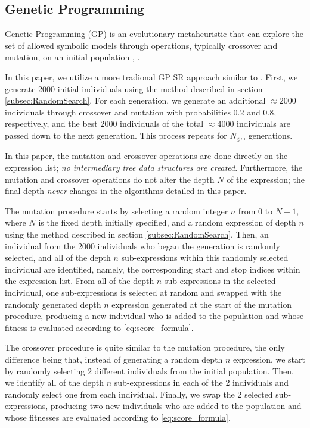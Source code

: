 \documentclass[12pt]{iopart}
\begin{document}
\subsection{Genetic Programming} \label{subsec:GeneticProgramming}
Genetic Programming (GP) is an evolutionary metaheuristic that can explore the set of allowed symbolic models through operations, typically crossover and mutation, on an initial population \cite{manti2023discovering} \cite{PoliFieldGuideGP}, \cite{Koza1994}.
\par In this paper, we utilize a more tradional GP SR approach similar to \cite{manti2023discovering}. First, we generate 2000 initial individuals using the method described in section \ref{subsec:RandomSearch}. For each generation, we generate an additional $\approx 2000$ individuals through crossover and mutation with probabilities 0.2 and 0.8, respectively, and the best 2000 individuals of the total $\approx 4000$ individuals are passed down to the next generation. This process repeats for $N_{\mathrm{gen}}$ generations.
\par In this paper, the mutation and crossover operations are done directly on the expression list; \emph{no intermediary tree data structures are created}. Furthermore, the mutation and crossover operations do not alter the depth $N$ of the expression; the final depth \emph{never} changes in the algorithms detailed in this paper. 
\par The mutation procedure starts by selecting a random integer $n$ from $0$ to $N-1$, where $N$ is the fixed depth initially specified, and a random expression of depth $n$ using the method described in section \ref{subsec:RandomSearch}. Then, an individual from the 2000 individuals who began the generation is randomly selected, and all of the depth $n$ sub-expressions within this randomly selected individual are identified, namely, the corresponding start and stop indices within the expression list. From all of the depth $n$ sub-expressions in the selected individual, one sub-expressions is selected at random and swapped with the randomly generated depth $n$ expression generated at the start of the mutation procedure, producing a new individual who is added to the population and whose fitness is evaluated according to \ref{eq:score_formula}.
\par The crossover procedure is quite similar to the mutation procedure, the only difference being that, instead of generating a random depth $n$ expression, we start by randomly selecting 2 different individuals from the initial population. Then, we identify all of the depth $n$ sub-expressions in each of the 2 individuals and randomly select one from each individual. Finally, we swap the 2 selected sub-expressions, producing two new individuals who are added to the population and whose fitnesses are evaluated according to \ref{eq:score_formula}.
\end{document}
